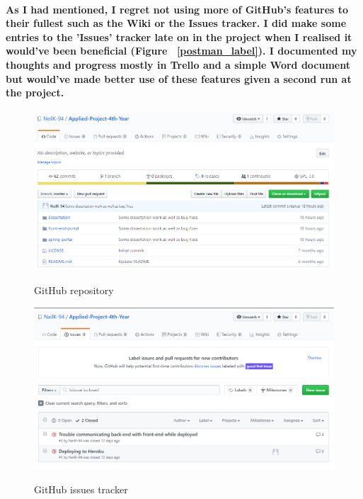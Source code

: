 \paragraph{As I had mentioned, I regret not using more of GitHub's features to their fullest such as the Wiki or the Issues tracker. I did make some entries to the 'Issues' tracker late on in the project when I realised it would've been beneficial (Figure ~\ref{postman_label}). I documented my thoughts and progress mostly in Trello and a simple Word document but would've made better use of these features given a second run at the project.}
\begin{figure}[ht]
    \centering
    \begin{minipage}{0.5\textwidth}
        \centering
        \includegraphics[scale=0.25]{Images/github1.png} 
        \label{git1_label}
        \caption{GitHub repository}
    \end{minipage}\hfill
    \begin{minipage}{0.5\textwidth}
        \centering
        \includegraphics[scale=0.25]{Images/github2.png}
        \label{git2_label}
        \caption{GitHub issues tracker}
    \end{minipage}
\end{figure}

